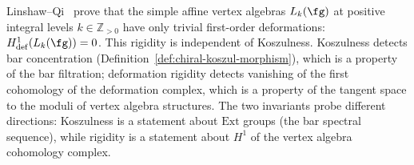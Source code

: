\begin{remark}
\label{rem:deformation-rigidity-integral}
Linshaw--Qi~\cite{LQ26} prove that the simple affine vertex algebras
$L_k(\fg)$ at positive integral levels $k \in \mathbb{Z}_{>0}$ have
only trivial first-order deformations: $H^1_{\mathrm{def}}(L_k(\fg))
= 0$. This rigidity is independent of Koszulness. Koszulness detects
bar concentration (Definition~\ref{def:chiral-koszul-morphism}), which
is a property of the bar filtration; deformation rigidity detects
vanishing of the first cohomology of the deformation complex, which is
a property of the tangent space to the moduli of vertex algebra
structures. The two invariants probe different directions: Koszulness
is a statement about $\mathrm{Ext}$ groups (the bar spectral sequence),
while rigidity is a statement about $H^1$ of the vertex algebra
cohomology complex.
\end{remark}

